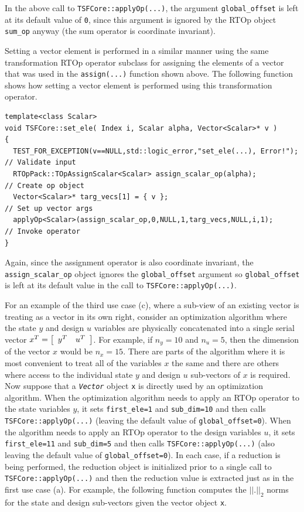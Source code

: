 {}\noindent{}In the above call to {}\texttt{TSFCore::applyOp(\-...)},
the argument {}\texttt{global\_offset} is left at its default value of
{}\texttt{0}, since this argument is ignored by the RTOp object
{}\texttt{sum\_op} anyway (the sum operator is coordinate invariant).

Setting a vector element is performed in a similar manner using the
same transformation RTOp operator subclass for assigning the elements
of a vector that was used in the {}\texttt{assign(...)} function shown
above.  The following function shows how setting a vector element is
performed using this transformation operator.

{\scriptsize\begin{verbatim}
template<class Scalar>
void TSFCore::set_ele( Index i, Scalar alpha, Vector<Scalar>* v )
{
  TEST_FOR_EXCEPTION(v==NULL,std::logic_error,"set_ele(...), Error!"); // Validate input
  RTOpPack::TOpAssignScalar<Scalar> assign_scalar_op(alpha);           // Create op object
  Vector<Scalar>* targ_vecs[1] = { v };                                // Set up vector args
  applyOp<Scalar>(assign_scalar_op,0,NULL,1,targ_vecs,NULL,i,1);       // Invoke operator
}
\end{verbatim}}

{}\noindent{}Again, since the assignment operator is also coordinate
invariant, the {}\texttt{assign\_scalar\_op} object ignores the
{}\texttt{global\_offset} argument so {}\texttt{global\_offset} is
left at its default value in the call to
{}\texttt{TSFCore::applyOp(\-...)}.

For an example of the third use case (c), where a sub-view of an
existing vector is treating as a vector in its own right, consider an
optimization algorithm where the state $y$ and design $u$ variables
are physically concatenated into a single serial vector $x^T =
{\bmat{cc} y^T & u^T \emat}$.  For example, if $n_y = 10$ and $n_u =
5$, then the dimension of the vector $x$ would be $n_x = 15$.  There
are parts of the algorithm where it is most convenient to treat all of
the variables $x$ the same and there are others where access to the
individual state $y$ and design $u$ sub-vectors of $x$ is required.
Now suppose that a {}\texttt{\textit{Vector}} object {}\texttt{x} is
directly used by an optimization algorithm.  When the optimization
algorithm needs to apply an RTOp operator to the state variables $y$,
it sets {}\texttt{first\_ele=1} and {}\texttt{sub\_dim=10} and then
calls {}\texttt{TSFCore::applyOp(\-...)} (leaving the default value of
{}\texttt{global\_offset=0}).  When the algorithm needs to apply an
RTOp operator to the design variables $u$, it sets
{}\texttt{first\_ele=11} and {}\texttt{sub\_dim=5} and then calls
{}\texttt{TSFCore::applyOp(\-...)} (also leaving the default value of
{}\texttt{global\_offset=0}).  In each case, if a reduction is being
performed, the reduction object is initialized prior to a single call
to {}\texttt{TSFCore::applyOp(\-...)} and then the reduction value is
extracted just as in the first use case (a).  For example, the
following function computes the $||.||_2$ norms for the state and
design sub-vectors given the vector object {}\texttt{x}.

